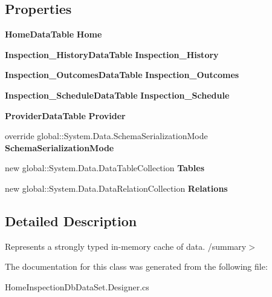 \subsection*{Properties}
\begin{DoxyCompactItemize}
\item 
\mbox{\label{class_a_f_h___scheduler_1_1_home_inspection_db_data_set_aa3a5ff72c7f1f454d06821ae9a0a6cbe}} 
\textbf{ Home\+Data\+Table} {\bfseries Home}\hspace{0.3cm}{\ttfamily  [get]}
\item 
\mbox{\label{class_a_f_h___scheduler_1_1_home_inspection_db_data_set_a8018e9bc45d7801e09e3c6d3b1e50637}} 
\textbf{ Inspection\+\_\+\+History\+Data\+Table} {\bfseries Inspection\+\_\+\+History}\hspace{0.3cm}{\ttfamily  [get]}
\item 
\mbox{\label{class_a_f_h___scheduler_1_1_home_inspection_db_data_set_a36adc6039a254e0d02a606adfed4be12}} 
\textbf{ Inspection\+\_\+\+Outcomes\+Data\+Table} {\bfseries Inspection\+\_\+\+Outcomes}\hspace{0.3cm}{\ttfamily  [get]}
\item 
\mbox{\label{class_a_f_h___scheduler_1_1_home_inspection_db_data_set_a8653f85c8c7b8c1f97eb77d43ae1c07e}} 
\textbf{ Inspection\+\_\+\+Schedule\+Data\+Table} {\bfseries Inspection\+\_\+\+Schedule}\hspace{0.3cm}{\ttfamily  [get]}
\item 
\mbox{\label{class_a_f_h___scheduler_1_1_home_inspection_db_data_set_a29ca7ff9e581cc2197c653704ca89806}} 
\textbf{ Provider\+Data\+Table} {\bfseries Provider}\hspace{0.3cm}{\ttfamily  [get]}
\item 
\mbox{\label{class_a_f_h___scheduler_1_1_home_inspection_db_data_set_af1aec1d5f239354539764890384910eb}} 
override global\+::\+System.\+Data.\+Schema\+Serialization\+Mode {\bfseries Schema\+Serialization\+Mode}\hspace{0.3cm}{\ttfamily  [get, set]}
\item 
\mbox{\label{class_a_f_h___scheduler_1_1_home_inspection_db_data_set_a137f398faa06553e001fc87e893b13e2}} 
new global\+::\+System.\+Data.\+Data\+Table\+Collection {\bfseries Tables}\hspace{0.3cm}{\ttfamily  [get]}
\item 
\mbox{\label{class_a_f_h___scheduler_1_1_home_inspection_db_data_set_a9f9cd6fe43ae4d0fab1ee4feeac0912a}} 
new global\+::\+System.\+Data.\+Data\+Relation\+Collection {\bfseries Relations}\hspace{0.3cm}{\ttfamily  [get]}
\end{DoxyCompactItemize}


\subsection{Detailed Description}
Represents a strongly typed in-\/memory cache of data. /summary$>$ 

The documentation for this class was generated from the following file\+:\begin{DoxyCompactItemize}
\item 
Home\+Inspection\+Db\+Data\+Set.\+Designer.\+cs\end{DoxyCompactItemize}
